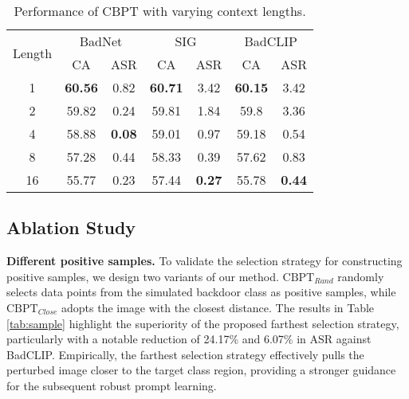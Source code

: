 \begin{table}
  \centering
  \caption{Performance of CBPT with varying context lengths.}
  \resizebox{0.85\linewidth}{!}
  {\begin{tabular}{ccccccc} 
    \toprule
    \multicolumn{1}{c}{\multirow{2}[0]{*}{Length}} 
    & \multicolumn{2}{c}{BadNet}                   
    & \multicolumn{2}{c}{SIG}               
    & \multicolumn{2}{c}{BadCLIP} \\ 

    \cmidrule(lr){2-3} 
    \cmidrule(lr){4-5} 
    \cmidrule(lr){6-7} 
    
    & CA & ASR 
    & CA & ASR 
    & CA & ASR \\ 
    
    \midrule
    
    1   
    & \textbf{60.56} & 0.82     & \textbf{60.71} & 3.42     & \textbf{60.15} & 3.42 \\
    
    2         
    & 59.82    & 0.24     & 59.81    & 1.84     & 59.8     & 3.36  \\
    
    
    4        
    & 58.88    & \textbf{0.08} & 59.01    & 0.97     & 59.18    & 0.54 \\ 

    8       
    & 57.28    & 0.44     & 58.33    & 0.39     & 57.62    & 0.83 \\ 

    16       
    & 55.77    & 0.23     & 57.44    & \textbf{0.27} & 55.78    & \textbf{0.44} \\ 
    
    \bottomrule
  \end{tabular}
  }
  \label{tab:context_length}%
\end{table}

\subsection{Ablation Study}
\textbf{Different positive samples.}
To validate the selection strategy for constructing positive samples, we design two variants of our method. $\text{CBPT}_{Rand}$ randomly selects data points from the simulated backdoor class as positive samples, while $\text{CBPT}_{Close}$ adopts the image with the closest distance. The results in Table \ref{tab:sample} highlight the superiority of the proposed farthest selection strategy, particularly with a notable reduction of 24.17\% and 6.07\% in ASR against BadCLIP. Empirically, the farthest selection strategy effectively pulls the perturbed image closer to the target class region, providing a stronger guidance for the subsequent robust prompt learning.

